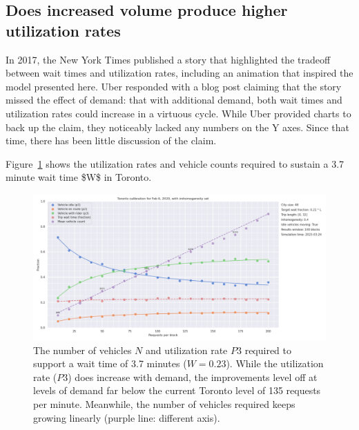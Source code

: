 \documentclass[
  letterpaper,
]{article}
\begin{document}
\hypertarget{does-increased-volume-produce-higher-utilization-rates}{%
\subsection{Does increased volume produce higher utilization
rates}\label{does-increased-volume-produce-higher-utilization-rates}}

In 2017, the New York Times published a story that highlighted the
tradeoff between wait times and utilization rates, including an
animation that inspired the model presented here. Uber responded with a
blog post claiming that the story missed the effect of demand: that with
additional demand, both wait times and utilization rates could increase
in a virtuous cycle. While Uber provided charts to back up the claim,
they noticeably lacked any numbers on the Y axes. Since that time, there
has been little discussion of the claim.

Figure~\ref{fig-fixed-wait-time} shows the utilization rates and vehicle
counts required to sustain a 3.7 minute wait time \$W\$ in Toronto.

\begin{figure}

{\centering \includegraphics[width=1\textwidth,height=\textheight]{wait_times.png}

}

\caption{\label{fig-fixed-wait-time}The number of vehicles \(N\) and
utilization rate \(P3\) required to support a wait time of 3.7 minutes
(\(W =0.23\)). While the utilization rate (\(P3\)) does increase with
demand, the improvements level off at levels of demand far below the
current Toronto level of 135 requests per minute. Meanwhile, the number
of vehicles required keeps growing linearly (purple line: different
axis).}

\end{figure}
\end{document}
